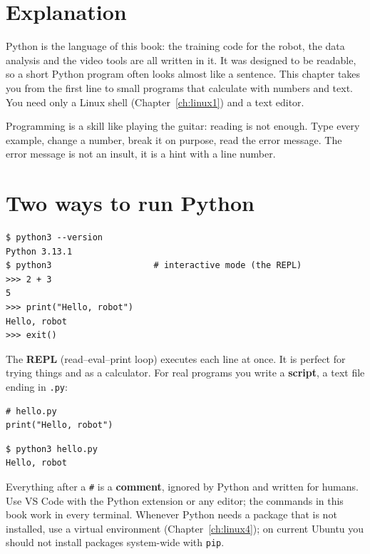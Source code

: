 \label{ch:py1}

\section*{Explanation}
Python is the language of this book: the training code for the robot, the data analysis and the video tools are all written in it. It was designed to be readable, so a short Python program often looks almost like a sentence. This chapter takes you from the first line to small programs that calculate with numbers and text. You need only a Linux shell (Chapter~\ref{ch:linux1}) and a text editor.

\begin{keyidea}
Programming is a skill like playing the guitar: reading is not enough. Type every example, change a number, break it on purpose, read the error message. The error message is not an insult, it is a hint with a line number.
\end{keyidea}

\section*{Two ways to run Python}
\begin{verbatim}
$ python3 --version
Python 3.13.1
$ python3                    # interactive mode (the REPL)
>>> 2 + 3
5
>>> print("Hello, robot")
Hello, robot
>>> exit()
\end{verbatim}
The \textbf{REPL} (read--eval--print loop) executes each line at once. It is perfect for trying things and as a calculator. For real programs you write a \textbf{script}, a text file ending in \texttt{.py}:
\begin{verbatim}
# hello.py
print("Hello, robot")
\end{verbatim}
\begin{verbatim}
$ python3 hello.py
Hello, robot
\end{verbatim}
Everything after a \texttt{\#} is a \textbf{comment}, ignored by Python and written for humans. Use VS Code with the Python extension or any editor; the commands in this book work in every terminal. Whenever Python needs a package that is not installed, use a virtual environment (Chapter~\ref{ch:linux4}); on current Ubuntu you should not install packages system-wide with \texttt{pip}.

